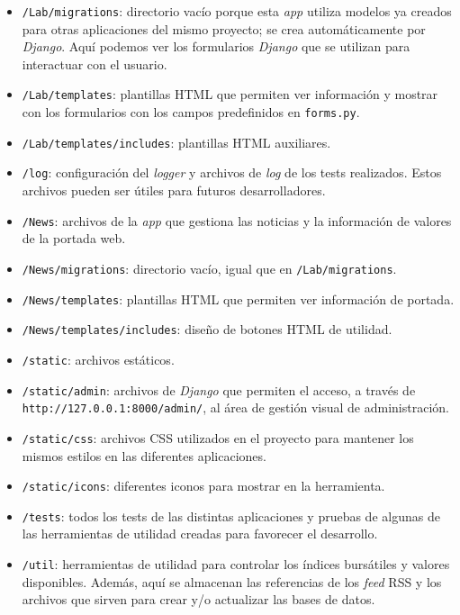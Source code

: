 \begin{itemize}
\item 
\texttt{/Lab/migrations}: directorio vacío porque esta \emph{app} utiliza modelos ya creados para otras aplicaciones del mismo proyecto; se crea automáticamente por \emph{Django}. Aquí podemos ver los formularios \emph{Django} que se utilizan para interactuar con el usuario. 

\item 
\texttt{/Lab/templates}: plantillas HTML que permiten ver información y mostrar con los formularios con los campos predefinidos en \texttt{forms.py}.

\item 
\texttt{/Lab/templates/includes}: plantillas HTML auxiliares.

\item 
\texttt{/log}: configuración del \emph{logger} y archivos de \emph{log} de los tests realizados. Estos archivos pueden ser útiles para futuros desarrolladores.

\item 
\texttt{/News}: archivos de la \emph{app} que gestiona las noticias y la información de valores de la portada web. 

\item 
\texttt{/News/migrations}: directorio vacío, igual que en \texttt{/Lab/migrations}.

\item 
\texttt{/News/templates}: plantillas HTML que permiten ver información de portada. 

\item 
\texttt{/News/templates/includes}: diseño de botones HTML de utilidad. 

\item 
\texttt{/static}: archivos estáticos. 


\item 
\texttt{/static/admin}: archivos de \emph{Django} que permiten el acceso, a través de \texttt{http://127.0.0.1:8000/admin/}, al área de gestión visual de administración.

\item 
\texttt{/static/css}: archivos CSS utilizados en el proyecto para mantener los mismos estilos en las diferentes aplicaciones. 

\item 
\texttt{/static/icons}: diferentes iconos para mostrar en la herramienta. 


\item 
\texttt{/tests}: todos los tests de las distintas aplicaciones y pruebas de algunas de las herramientas de utilidad creadas para favorecer el desarrollo. 

\item 
\texttt{/util}: herramientas de utilidad para controlar los índices bursátiles y valores disponibles. Además, aquí se almacenan las referencias de los \emph{feed} RSS y los archivos que sirven para crear y/o actualizar las bases de datos. 
\end{itemize}


